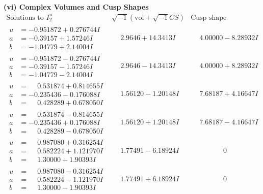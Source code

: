 \documentclass[1p]{elsarticle_modified}
\theoremstyle{definition}
\newcommand{\I}{\sqrt{-1}}
\begin{document}
\newpage\flushleft \textbf{(vi) Complex Volumes and Cusp Shapes}
$$\begin{array}{c|c|c}  
\text{Solutions to }I^u_{2}& \I (\text{vol} + \sqrt{-1}CS) & \text{Cusp shape}\\
 \hline 
\begin{aligned}
u &= -0.951872 + 0.276744 I \\
a &= -0.39157 + 1.57246 I \\
b &= -1.04779 + 2.14004 I\end{aligned}
 & \phantom{-}2.9646 + 14.3413 I & \phantom{-}4.00000 - 8.28932 I \\ \hline\begin{aligned}
u &= -0.951872 - 0.276744 I \\
a &= -0.39157 - 1.57246 I \\
b &= -1.04779 - 2.14004 I\end{aligned}
 & \phantom{-}2.9646 - 14.3413 I & \phantom{-}4.00000 + 8.28932 I \\ \hline\begin{aligned}
u &= \phantom{-}0.531874 + 0.814655 I \\
a &= -0.235436 - 0.176088 I \\
b &= \phantom{-}0.428289 + 0.678050 I\end{aligned}
 & \phantom{-}1.56120 - 1.20148 I & \phantom{-}7.68187 + 4.16647 I \\ \hline\begin{aligned}
u &= \phantom{-}0.531874 - 0.814655 I \\
a &= -0.235436 + 0.176088 I \\
b &= \phantom{-}0.428289 - 0.678050 I\end{aligned}
 & \phantom{-}1.56120 + 1.20148 I & \phantom{-}7.68187 - 4.16647 I \\ \hline\begin{aligned}
u &= \phantom{-}0.987080 + 0.316254 I \\
a &= \phantom{-}0.582224 + 1.121970 I \\
b &= \phantom{-}1.30000 + 1.90393 I\end{aligned}
 & \phantom{-}1.77491 - 6.18924 I & \phantom{-0.000000 } 0 \\ \hline\begin{aligned}
u &= \phantom{-}0.987080 - 0.316254 I \\
a &= \phantom{-}0.582224 - 1.121970 I \\
b &= \phantom{-}1.30000 - 1.90393 I\end{aligned}
 & \phantom{-}1.77491 + 6.18924 I & \phantom{-0.000000 } 0 \\ \hline\begin{aligned}

\end{aligned}
\end{array}$$
\end{document}
